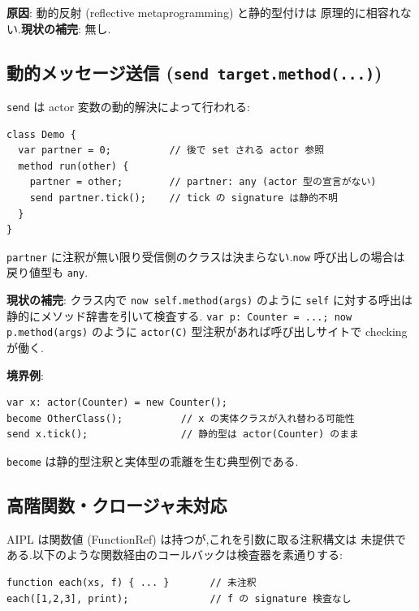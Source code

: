 \documentclass[11pt,a4paper]{article}
\newcommand{\code}[1]{\texttt{\small #1}}
\begin{document}
\textbf{原因}: 動的反射 (reflective metaprogramming) と静的型付けは
原理的に相容れない.\textbf{現状の補完}: 無し.

\subsection{動的メッセージ送信 (\code{send target.method(...)})}

\code{send} は actor 変数の動的解決によって行われる:

\begin{lstlisting}
class Demo {
  var partner = 0;          // 後で set される actor 参照
  method run(other) {
    partner = other;        // partner: any (actor 型の宣言がない)
    send partner.tick();    // tick の signature は静的不明
  }
}
\end{lstlisting}

\code{partner} に注釈が無い限り受信側のクラスは決まらない.\code{now}
呼び出しの場合は戻り値型も \code{any}.

\textbf{現状の補完}: クラス内で \code{now self.method(args)} のように
\code{self} に対する呼出は静的にメソッド辞書を引いて検査する.
\code{var p: Counter = ...; now p.method(args)} のように \code{actor(C)}
型注釈があれば呼び出しサイトで checking が働く.

\textbf{境界例}:

\begin{lstlisting}
var x: actor(Counter) = new Counter();
become OtherClass();          // x の実体クラスが入れ替わる可能性
send x.tick();                // 静的型は actor(Counter) のまま
\end{lstlisting}

\code{become} は静的型注釈と実体型の乖離を生む典型例である.

\subsection{高階関数・クロージャ未対応}

AIPL は関数値 (FunctionRef) は持つが,これを引数に取る注釈構文は
未提供である.以下のような関数経由のコールバックは検査器を素通りする:

\begin{lstlisting}
function each(xs, f) { ... }       // 未注釈
each([1,2,3], print);              // f の signature 検査なし
\end{lstlisting}
\end{document}
